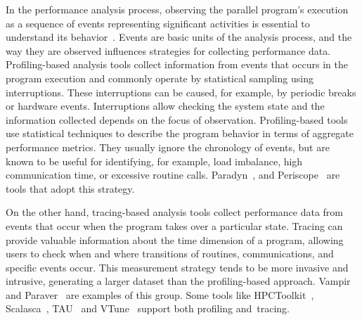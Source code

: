 In the performance analysis process, observing the parallel program's execution as a sequence of events representing significant activities is essential to understand its behavior~\cite{Pantazopoulos1997}. Events are basic units of the analysis process, and the way they are observed influences strategies for collecting performance data. Profiling-based analysis tools collect information from events that occurs in the program execution and commonly operate by statistical sampling using interruptions. These interruptions can be caused, for example, by periodic breaks or hardware events. Interruptions allow checking the system state and the information collected depends on the focus of observation. Profiling-based tools use statistical techniques to describe the program behavior in terms of aggregate performance metrics. They usually ignore the chronology of events, but are known to be useful for identifying, for example, load imbalance, high communication time, or excessive routine calls. Paradyn~\cite{Miller1995}, and Periscope~\cite{Gerndt2010} are tools that adopt this strategy.

On the other hand, tracing-based analysis tools collect performance data from events that occur when the program takes over a particular state. Tracing can provide valuable information about the time dimension of a program, allowing users to check when and where transitions of routines, communications, and specific events occur. This measurement strategy tends to be more invasive and intrusive, generating a larger dataset than the profiling-based approach. Vampir~\cite{Weber2019} and Paraver~\cite{Labarta2005} are examples of this group. Some tools like HPCToolkit~\cite{Adhianto2010}, Scalasca~\cite{Geimer2010}, TAU~\cite{Shende2006} and VTune~\cite{Intel2021Vtune} support both profiling and~tracing.

